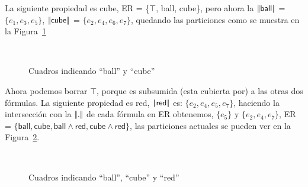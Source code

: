 La siguiente propiedad es \textsf{cube}, ER = \{$\top$, \textsf{ball}, \textsf{cube}\}, pero ahora la $|\!|\textsf{ball}|\!|$ = $\{e_1, e_3, e_5\}$, $|\!|\textsf{cube}|\!|$ = $\{e_2, e_4, e_6, e_7\}$, quedando las particiones como se muestra en la Figura~\ref{fig-modelo4}
\begin{figure}[ht]
\begin{center}
\\[0pt]
\caption{Cuadros indicando ``ball'' y ``cube''}
\label{fig-modelo4}
\end{center}
\end{figure}
Ahora podemos borrar $\top$, porque es subsumida (esta cubierta por) a las otras dos f\'ormulas. La siguiente propiedad es  \textsf{red}, $|\!|\textsf{red}|\!|$ es: $\{e_2, e_4, e_5, e_7\}$, haciendo la intersecci\'on con la $|\!|.|\!|$ de cada f\'ormula en ER obtenemos, $\{e_5\}$ y $\{e_2, e_4, e_7\}$, ER = $\{\textsf{ball}, \textsf{cube}, \textsf{ball} \wedge \textsf{red}, \textsf{cube} \wedge \textsf{red}\}$, las particiones actuales se pueden ver en la Figura~\ref{fig-modelo9}.
\begin{figure}[ht]
\begin{center}
\\[0pt]
\caption{Cuadros indicando ``ball'', ``cube'' y ``red''}
\label{fig-modelo9}
\end{center}
\end{figure}

